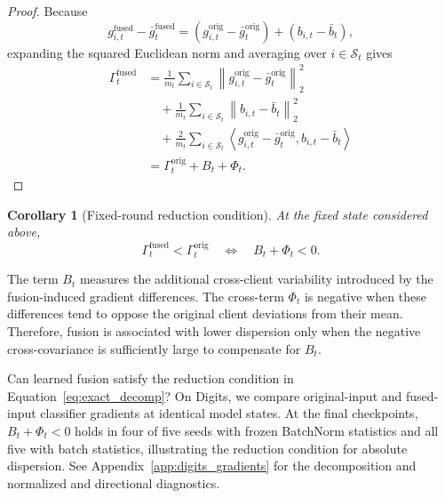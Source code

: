 \documentclass[twoside]{article}
\newcommand{\coauthorcolor}{}
\newenvironment{coauthorrevision}{\par\begingroup\coauthorcolor}{\par\endgroup}
\theoremstyle{thmstyleone}%
\newtheorem{corollary}{Corollary}
\theoremstyle{thmstyletwo}%
\theoremstyle{thmstylethree}%
\begin{document}
\begin{proof}
Because
\begin{equation*}
g_{i,t}^{\mathrm{fused}}
-
\bar{g}_t^{\mathrm{fused}}
=
\left(
g_{i,t}^{\mathrm{orig}}
-
\bar{g}_t^{\mathrm{orig}}
\right)
+
\left(
b_{i,t}-\bar{b}_t
\right),
\end{equation*}
expanding the squared Euclidean norm and averaging over
$i\in\mathcal{S}_t$ gives
\begin{align*}
\Gamma_t^{\mathrm{fused}}
&=
\frac{1}{m_t}
\sum_{i\in\mathcal{S}_t}
\left\|
g_{i,t}^{\mathrm{orig}}
-
\bar{g}_t^{\mathrm{orig}}
\right\|_2^2\\
&\quad+
\frac{1}{m_t}
\sum_{i\in\mathcal{S}_t}
\left\|
b_{i,t}-\bar{b}_t
\right\|_2^2\\
&\quad+
\frac{2}{m_t}
\sum_{i\in\mathcal{S}_t}
\left\langle
g_{i,t}^{\mathrm{orig}}-\bar{g}_t^{\mathrm{orig}},
b_{i,t}-\bar{b}_t
\right\rangle\\
&=
\Gamma_t^{\mathrm{orig}}+B_t+\Phi_t.
\end{align*}
\end{proof}

\begin{corollary}[Fixed-round reduction condition]
\label{cor:fixed_round_reduction}
At the fixed state considered above,
\begin{equation*}
\Gamma_t^{\mathrm{fused}}
<
\Gamma_t^{\mathrm{orig}}
\quad\Longleftrightarrow\quad
B_t+\Phi_t<0.
\end{equation*}
\end{corollary}

The term $B_t$ measures the additional cross-client variability introduced by
the fusion-induced gradient differences. The cross-term $\Phi_t$ is negative
when these differences tend to oppose the original client deviations from
their mean. Therefore, fusion is associated with lower dispersion only when
the negative cross-covariance is sufficiently large to compensate for
$B_t$.

\begin{coauthorrevision}
Can learned fusion satisfy the reduction condition in
Equation~\eqref{eq:exact_decomp}? On Digits, we compare original-input and
fused-input classifier gradients at identical model states. At the final
checkpoints, $B_t+\Phi_t<0$ holds in four of five seeds with frozen BatchNorm
statistics and all five with batch statistics, illustrating the reduction
condition for absolute dispersion. See Appendix~\ref{app:digits_gradients}
for the decomposition and normalized and directional diagnostics.
\end{coauthorrevision}
\end{document}
